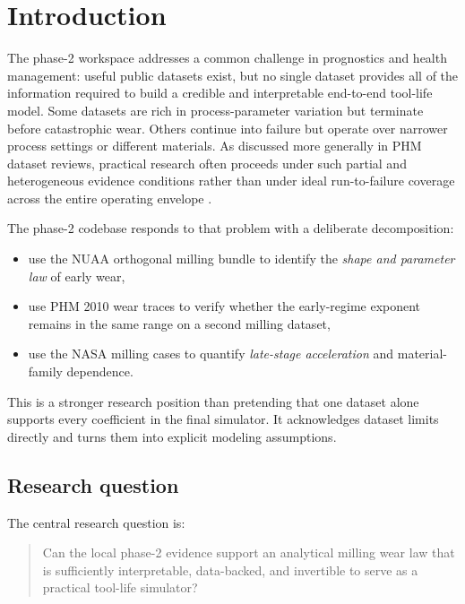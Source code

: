 \documentclass[11pt,a4paper]{article}
\begin{document}
\tableofcontents
\clearpage

\section{Introduction}

The phase-2 workspace addresses a common challenge in prognostics and health management:
useful public datasets exist, but no single dataset provides all of the information required to build a
credible and interpretable end-to-end tool-life model. Some datasets are rich in process-parameter
variation but terminate before catastrophic wear. Others continue into failure but operate over narrower
process settings or different materials. As discussed more generally in PHM dataset reviews, practical
research often proceeds under such partial and heterogeneous evidence conditions rather than under ideal
run-to-failure coverage across the entire operating envelope \cite{hagmeyer2021datasets}.

The phase-2 codebase responds to that problem with a deliberate decomposition:

\begin{itemize}[leftmargin=1.6em]
\item use the NUAA orthogonal milling bundle to identify the \emph{shape and parameter law} of early wear,
\item use PHM 2010 wear traces to verify whether the early-regime exponent remains in the same range on a second milling dataset,
\item use the NASA milling cases to quantify \emph{late-stage acceleration} and material-family dependence.
\end{itemize}

This is a stronger research position than pretending that one dataset alone supports every coefficient in the
final simulator. It acknowledges dataset limits directly and turns them into explicit modeling assumptions.

\subsection{Research question}

The central research question is:

\begin{quote}
Can the local phase-2 evidence support an analytical milling wear law that is sufficiently interpretable,
data-backed, and invertible to serve as a practical tool-life simulator?
\end{quote}
\end{document}
